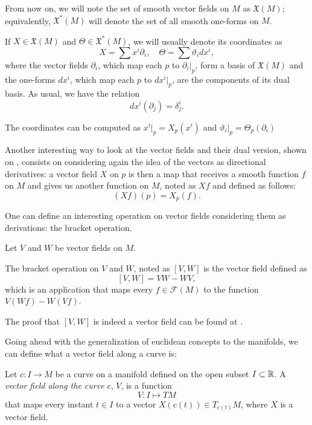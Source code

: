 From now on, we will note the set of smooth vector fields on $M$ as $\mathfrak{X}(M)$; equivalently, $\mathfrak{X}^*(M)$ will denote the set of all smooth one-forms on $M$.

If $X \in \mathfrak{X}(M)$ and $\Theta \in \mathfrak{X}^*(M)$, we will usually denote its coordinates as
\[
	X = \sum x^i \partial_i, \quad \Theta = \sum \vartheta_i dx^i,
\]
where the vector fields $\partial_i$, which map each $p$ to $\partial_i\bigr|_p$, form a basis of $\mathfrak{X}(M)$ and the one-forms $dx^i$, which map each $p$ to $dx^i \bigr|_p$, are the components of its dual basis. As usual, we have the relation 
\[
	dx^i\left(\partial_j\right) = \delta^i_j.
\]

The coordinates can be computed as $x^i\bigr|_p = X_p(x^i)$ and $\vartheta_i\bigr|_p = \Theta_p(\partial_i)$

Another interesting way to look at the vector fields and their dual version, shown on \cite[p. 23]{docarmo79}, consists on considering again the idea of the vectors as directional derivatives: a vector field $X$ on $p$ is then a map that receives a smooth function $f$ on $M$ and gives us another function on $M$, noted as $Xf$ and defined as follows:
\[
	(Xf)(p) = X_p(f).
\]

One can define an interesting operation on vector fields considering them as derivations: the bracket operation.

\begin{definition}
	Let $V$ and $W$ be vector fields on $M$.
	
	The bracket operation on $V$ and $W$, noted as $[V, W]$ is the vector field defined as
	\[
		[V, W] = VW - WV,
	\]
	which is an application that maps every $f \in \mathcal{F}(M)$ to the function $V(Wf) - W(Vf)$.
\end{definition}

The proof that $[V,W]$ is indeed a vector field can be found at \cite[p. 24]{docarmo79}.

Going ahead with the generalization of euclidean concepts to the manifolds, we can define what a vector field along a curve is:

\begin{definition}
	Let $c \colon I \to M$ be a curve on a manifold defined on the open subset $I \subset \mathbb{R}$. A \emph{vector field along the curve $c$}, $V$, is a function
	\[
	V \colon I \mapsto TM
	\]
	that maps every instant $t \in I$ to a vector $X(c(t)) \in T_{c(t)} M$, where $X$ is a vector field.
\end{definition}

